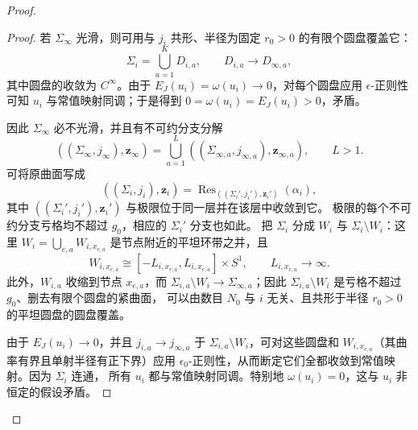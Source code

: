 \begin{proof}
\begin{proof}
若 $\Sigma_\infty$ 光滑，则可用与 $j_i$ 共形、半径为固定
$r_0>0$ 的有限个圆盘覆盖它：
\[
 \Sigma_i=\bigcup_{a=1}^K D_{i,a},
 \qquad D_{i,a}\longrightarrow D_{\infty,a},
\]
其中圆盘的收敛为 $C^\infty$。由于
$E_J(u_i)=\omega(u_i)\to0$，对每个圆盘应用 $\epsilon$-正则性可知
$u_i$ 与常值映射同调；于是得到
$0=\omega(u_i)=E_J(u_i)>0$，矛盾。

因此 $\Sigma_\infty$ 必不光滑，并且有不可约分支分解
\[
 ((\Sigma_\infty,j_\infty),\boldsymbol z_\infty)
 =\bigcup_{a=1}^L((\Sigma_{\infty,a},j_{\infty,a}),
 \boldsymbol z_{\infty,a}),\qquad L>1.
\]
可将原曲面写成
\[
 ((\Sigma_i,j_i),\boldsymbol z_i)
 =\operatorname{Res}_{((\Sigma_i',j_i'),\boldsymbol z_i')}(\alpha_i),
\]
其中 $((\Sigma_i',j_i'),\boldsymbol z_i')$ 与极限位于同一层并在该层中收敛到它。
极限的每个不可约分支亏格均不超过 $g_0$，相应的 $\Sigma_i'$ 分支也如此。
把 $\Sigma_i$ 分成 $W_i$ 与 $\Sigma_i\setminus W_i$：这里
$W_i=\bigcup_{e,a}W_{i,x_{e,a}}$ 是节点附近的平坦环带之并，且
\[
 W_{i,x_{e,a}}\cong[-L_{i,x_{e,a}},L_{i,x_{e,a}}]\times S^1,
 \qquad L_{i,x_{e,a}}\to\infty.
\]
此外，$W_{i,a}$ 收缩到节点 $x_{e,a}$，而
$\Sigma_{i,a}\setminus W_i\to\Sigma_{\infty,a}$；因此
$\Sigma_{i,a}\setminus W_i$ 是亏格不超过 $g_0$、删去有限个圆盘的紧曲面，
可以由数目 $N_0$ 与 $i$ 无关、且共形于半径 $r_0>0$ 的平坦圆盘的圆盘覆盖。

由于 $E_J(u_i)\to0$，并且 $j_{i,a}\to j_{\infty,a}$ 于
$\Sigma_{i,a}\setminus W_i$，可对这些圆盘和
$W_{i,x_{e,a}}$（其曲率有界且单射半径有正下界）应用
$\epsilon_0$-正则性，从而断定它们全都收敛到常值映射。因为 $\Sigma_i$ 连通，
所有 $u_i$ 都与常值映射同调。特别地 $\omega(u_i)=0$，这与 $u_i$ 非恒定的假设矛盾。
\end{proof}


\end{proof}
